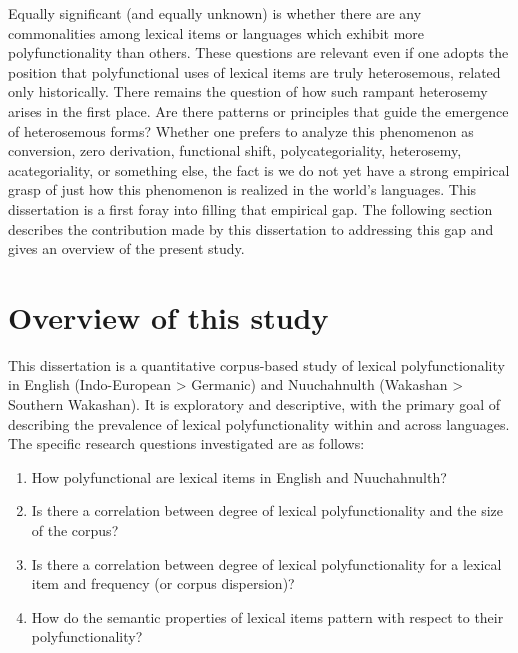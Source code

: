 \noindent Equally significant (and equally unknown) is whether there are any commonalities among lexical items or languages which exhibit more polyfunctionality than others. These questions are relevant even if one adopts the position that polyfunctional uses of lexical items are truly heterosemous, related only historically. There remains the question of how such rampant heterosemy arises in the first place. Are there patterns or principles that guide the emergence of heterosemous forms? Whether one prefers to analyze this phenomenon as conversion, zero derivation, functional shift, polycategoriality, heterosemy, acategoriality, or something else, the fact is we do not yet have a strong empirical grasp of just how this phenomenon is realized in the world's languages. This dissertation is a first foray into filling that empirical gap. The following section describes the contribution made by this dissertation to addressing this gap and gives an overview of the present study.

\section{Overview of this study}
\label{sec:1.3}

This dissertation is a quantitative corpus-based study of lexical polyfunctionality in English (Indo-European > Germanic) and Nuuchahnulth (Wakashan > Southern Wakashan). It is exploratory and descriptive, with the primary goal of describing the prevalence of lexical polyfunctionality within and across languages. The specific research questions investigated are as follows:

\begin{enumerate}[
  label      = {\textbf{R\arabic*:}},
  leftmargin = *,
  ref        = {R\arabic*}
]
  \item\label{R1} How polyfunctional are lexical items in English and Nuuchahnulth?
  \item\label{R2} Is there a correlation between degree of lexical polyfunctionality and the size of the corpus?
  \item\label{R3} Is there a correlation between degree of lexical polyfunctionality for a lexical item and frequency (or corpus dispersion)?
  \item\label{R4} How do the semantic properties of lexical items pattern with respect to their polyfunctionality?
\end{enumerate}

